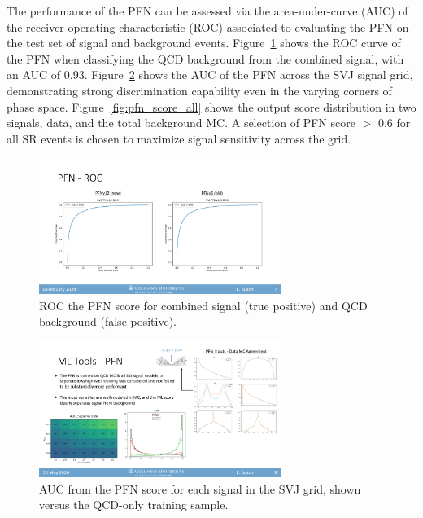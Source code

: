 The performance of the PFN can be assessed via the area-under-curve (AUC) of the receiver operating characteristic (ROC) associated to evaluating the PFN on the test set of signal and background events. Figure~\ref{fig:pfn_roc} shows the ROC curve of the PFN when classifying the QCD background from the combined signal, with an AUC of 0.93. Figure~\ref{fig:pfn_AUC_score_grid} shows the AUC of the PFN across the SVJ signal grid, demonstrating strong discrimination capability even in the varying corners of phase space. 
Figure~\ref{fig:pfn_score_all} shows the output score distribution in two signals, data, and the total background MC.
A selection of PFN score $>$ 0.6 for all SR events is chosen to maximize signal sensitivity across the grid. 
\begin{figure}[!htbp]
\centering
   \includegraphics[width=0.7\textwidth]{figures/ml/pfn_roc}
    \caption{ROC the PFN score for combined signal (true positive) and QCD background (false positive).
    \label{fig:pfn_roc}}
\end{figure}
\begin{figure}[!htbp]
\centering
   \includegraphics[width=0.7\textwidth]{figures/ml/pfn_AUC_grid}
    \caption{AUC from the PFN score for each signal in the SVJ grid, shown versus the QCD-only training sample.
    \label{fig:pfn_AUC_score_grid}}
\end{figure}


